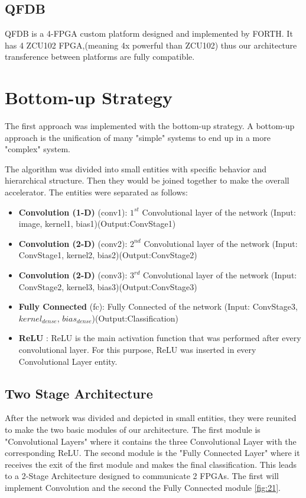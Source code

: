 \subsection{QFDB}
QFDB is a 4-FPGA custom platform designed and implemented by FORTH. It has 4 ZCU102 FPGA,(meaning 4x powerful than ZCU102) thus our architecture transference between platforms are fully compatible. 

\section{Bottom-up Strategy}
The first approach was implemented with the bottom-up strategy. A bottom-up approach is the unification of many "simple" systems to end up in a more "complex" system.





The algorithm was divided into small entities with specific behavior and hierarchical structure. Then they would be joined together to make the overall accelerator. The entities were separated as follows:
\begin{itemize}

    \item \textbf{Convolution (1-D) }(conv1): $1^{st}$ Convolutional layer of the network (Input: image, kernel1, bias1)(Output:ConvStage1)
    \item \textbf{Convolution (2-D) }(conv2): $2^{nd}$ Convolutional layer of the network (Input: ConvStage1, kernel2, bias2)(Output:ConvStage2)
    \item \textbf{Convolution (2-D) }(conv3): $3^{rd}$ Convolutional layer of the network (Input: ConvStage2, kernel3, bias3)(Output:ConvStage3)
    \item \textbf{Fully Connected }(fc):  Fully Connected of the network (Input: ConvStage3, $kernel_{dense}$, $bias_{dense}$)(Output:Classification) 

    \item \textbf{ReLU} : ReLU is the main activation function that was performed after every convolutional layer. For this purpose, ReLU was inserted in every Convolutional Layer entity.
\end{itemize}


\subsection{Two Stage Architecture}
After the network was divided and depicted in small entities, they were reunited to make the two basic modules of our architecture. The first module is  "Convolutional Layers" where it contains the three Convolutional Layer with the corresponding ReLU. The second module is the "Fully Connected Layer" where it receives the exit of the first module and makes the final classification.
This leads to a 2-Stage Architecture designed to communicate 2 FPGAs. The first will implement Convolution and the second the Fully Connected module \ref{fig:21}.

